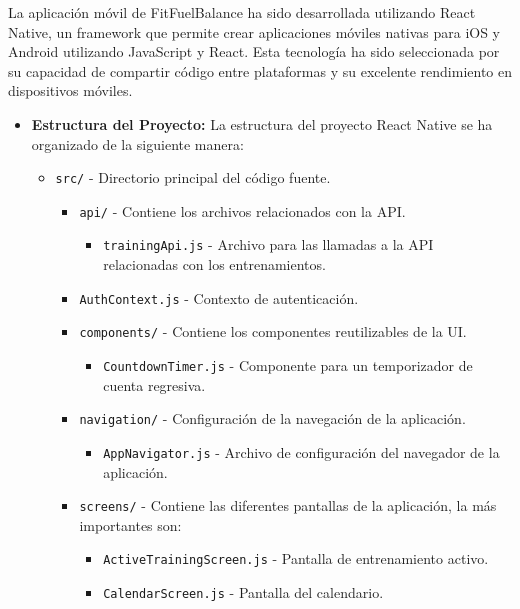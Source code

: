 La aplicación móvil de FitFuelBalance ha sido desarrollada utilizando React Native, un framework que permite crear aplicaciones móviles nativas para iOS y Android utilizando JavaScript y React. Esta tecnología ha sido seleccionada por su capacidad de compartir código entre plataformas y su excelente rendimiento en dispositivos móviles.

\begin{itemize}
    \item \textbf{Estructura del Proyecto:} La estructura del proyecto React Native se ha organizado de la siguiente manera:
    \begin{itemize}
        \item \texttt{src/} - Directorio principal del código fuente.
        \begin{itemize}
            \item \texttt{api/} - Contiene los archivos relacionados con la API.
            \begin{itemize}
                \item \texttt{trainingApi.js} - Archivo para las llamadas a la API relacionadas con los entrenamientos.
            \end{itemize}
            \item \texttt{AuthContext.js} - Contexto de autenticación.
            \item \texttt{components/} - Contiene los componentes reutilizables de la UI.
            \begin{itemize}
                \item \texttt{CountdownTimer.js} - Componente para un temporizador de cuenta regresiva.
            \end{itemize}
            \item \texttt{navigation/} - Configuración de la navegación de la aplicación.
            \begin{itemize}
                \item \texttt{AppNavigator.js} - Archivo de configuración del navegador de la aplicación.
            \end{itemize}
            \item \texttt{screens/} - Contiene las diferentes pantallas de la aplicación, la más importantes son:
            \begin{itemize}
                \item \texttt{ActiveTrainingScreen.js} - Pantalla de entrenamiento activo.
                \item \texttt{CalendarScreen.js} - Pantalla del calendario.

\end{itemize}
\end{itemize}
\end{itemize}
\end{itemize}
